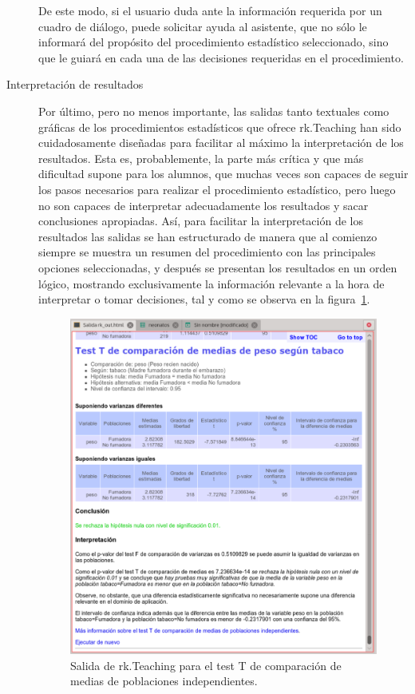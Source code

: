 \documentclass[a4paper,10pt,twoside]{article}
\newcommand{\rkteaching}{\textsf{rk.Teaching}}
\begin{document}
\begin{description}
De este modo, si el usuario duda ante la información requerida por un cuadro de diálogo, puede solicitar
ayuda al asistente, que no sólo le informará del propósito del procedimiento estadístico seleccionado, sino que le
guiará en cada una de las decisiones requeridas en el procedimiento.

\item[Interpretación de resultados] Por último, pero no menos importante, las salidas tanto textuales como gráficas
de los procedimientos estadísticos que ofrece \rkteaching{} han sido cuidadosamente diseñadas para facilitar al máximo
la interpretación de los resultados. 
Esta es, probablemente, la parte más crítica y que más dificultad supone para los alumnos, que muchas veces son
capaces de seguir los pasos necesarios para realizar el procedimiento estadístico, pero luego no son capaces de
interpretar adecuadamente los resultados y sacar conclusiones apropiadas. 
Así, para facilitar la interpretación de los resultados las salidas se han estructurado de manera que al
comienzo siempre se muestra un resumen del procedimiento con las principales opciones seleccionadas, y
después se presentan los resultados en un orden lógico, mostrando exclusivamente la información relevante
a la hora de interpretar o tomar decisiones, tal y como se observa en la figura~\ref{f:salida-test-t}. 

\begin{figure}[htbp!]
\centering
\includegraphics[width=\textwidth]{img/salida_test_t.png}
\caption{Salida de \rkteaching{} para el test T de comparación de medias de poblaciones independientes.}
\label{f:salida-test-t}
\end{figure}


\end{description}
\end{document}
